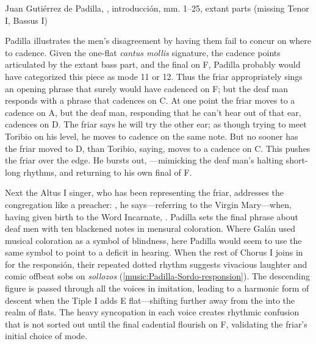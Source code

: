 \begin{musicexample}
    \caption{Juan Gutiérrez de Padilla, ,
    introducción, mm. 1--25, extant parts (missing Tenor I, Bassus I)}

    \label{music:Padilla-Sordo-intro}

\end{musicexample}

Padilla illustrates the men's disagreement by having them fail to concur on
where to cadence.
Given the one-flat \emph{cantus mollis} signature, the cadence points
articulated by the extant bass part, and the final on F, Padilla probably would
have categorized this piece as mode 11 or 12.%
    \Autocites
    [873--882]{Cerone:Melopeo} 
    {Judd:RenaissanceModalTheory}{Barnett:TonalOrganization17C}  
Thus the friar appropriately sings an opening phrase that surely would have
cadenced on F; but the deaf man responds with a phrase that cadences on C.
At one point the friar moves to a cadence on A, but the deaf man, responding
that he can't hear out of that ear, cadences on D. 
The friar says he will try the other ear; as though trying to meet Toribio on
his level, he moves to cadence on the same note.
But no sooner has the friar moved to D, than Toribio, saying,  moves to a cadence on C.  
This pushes the friar over the edge.
He bursts out, ---mimicking the deaf man's
halting short-long rhythms, and returning to his own final of F.

Next the Altus I singer, who has been representing the friar, addresses the
congregation like a preacher: , he says---referring to the Virgin Mary---when, having given birth to the
Word Incarnate, .  
Padilla sets the final phrase about deaf men with ten blackened notes in
mensural coloration.
Where Galán used musical coloration as a symbol of blindness, here Padilla would
seem to use the same symbol to point to a deficit in hearing.
When the rest of Chorus I joins in for the responsión, their repeated dotted
rhythm suggests vivacious laughter and comic offbeat sobs on \emph{sollozos}
(\cref{music:Padilla-Sordo-responsion}).
The descending figure is passed through all the voices in imitation, leading to
a harmonic form of descent when the Tiple I adds E flat---shifting further away
from the  into the  realm of flats.
The heavy syncopation in each voice creates rhythmic confusion that is not
sorted out until the final cadential flourish on F, validating the friar's
initial choice of mode.

